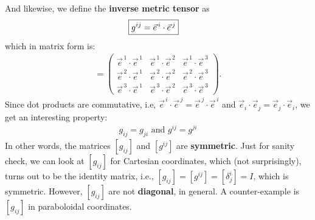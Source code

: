 \documentclass{article}
\theoremstyle{definition}
\begin{document}
And likewise, we define the \textbf{inverse metric tensor} as
\begin{align*}
\Aboxed{g^{ij} &= \vec{e}^{\,i}\cdot\vec{e}^{\,j}}
\end{align*}
which in matrix form is:
\begin{align*}
[g^{ij}] = 
\begin{pmatrix}
\vec{e}^{\,1}\cdot\vec{e}^{\,1} & \vec{e}^{\,1}\cdot\vec{e}^{\,2} & \vec{e}^{\,1}\cdot\vec{e}^{\,3} \\
\vec{e}^{\,2}\cdot\vec{e}^{\,1} & \vec{e}^{\,2}\cdot\vec{e}^{\,2} & \vec{e}^{\,2}\cdot\vec{e}^{\,3} \\
\vec{e}^{\,3}\cdot\vec{e}^{\,1} & \vec{e}^{\,3}\cdot\vec{e}^{\,2} & \vec{e}^{\,3}\cdot\vec{e}^{\,3} 
\end{pmatrix}.
\end{align*}
Since dot products are commutative, i.e, $\vec{e}^{\,i}\cdot\vec{e}^{\,j} = \vec{e}^{\,j}\cdot\vec{e}^{\,i}$ and $\vec{e}_i\cdot\vec{e}_j = \vec{e}_j\cdot\vec{e}_i$, we get an interesting property:
\begin{align*}
\boxed{g_{ij} = g_{ji} \text{ and }  g^{ij} = g^{ji}}
\end{align*}
In other words, the matrices $[g_{ij}]$ and $[g^{ij}]$ are \textbf{symmetric}. Just for sanity check, we can look at $[g_{ij}]$ for Cartesian coordinates, which (not surprisingly), turns out to be the identity matrix, i.e., $[g_{ij}] = [g^{ij}] = [\delta^i_j] = I$, which is symmetric. However, $[g_{ij}]$ are not \textbf{diagonal}, in general. A counter-example is $[g_{ij}]$ in paraboloidal coordinates. \\
\end{document}
